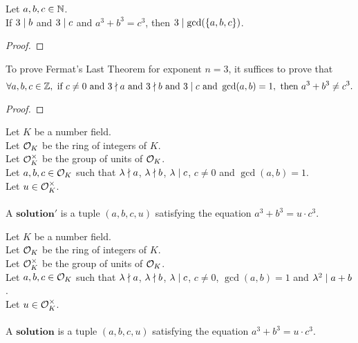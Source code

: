 \begin{lemma}
    \label{lmm:three_dvd_gcd_of_dvd_b_of_dvd_c}
    \leanok
    Let $a, b, c \in \mathbb{N}$. \\
    If $3 \mid b$ and $3 \mid c$ and $a ^ 3 + b ^ 3 = c ^ 3$, then $3 \mid \gcd(\left\{a, b, c\right\})$.
\end{lemma}
\begin{proof}
    \leanok
\end{proof}

\begin{theorem}
    \label{thm:fermatLastTheoremThree_of_three_dvd_only_c}
    \leanok
    To prove Fermat's Last Theorem for exponent $n=3$, it suffices to prove that
    $$\forall a, b, c \in \mathbb{Z}, \text{ if } c \neq 0 \text{ and } 3 \nmid a \text{ and }
    3 \nmid b \text{ and } 3 \mid c \text{ and } \gcd(a,b)=1,
    \text{ then } a^3 + b^3 \neq c^3.$$
\end{theorem}
\begin{proof}
    \leanok
\end{proof}

\begin{definition}[Solution$'$]
    \label{def:Solution'}
    \leanok
    Let $K$ be a number field. \\
    Let $\mathcal{O}_K$ be the ring of integers of $K$. \\
    Let $\mathcal{O}^\times_K$ be the group of units of $\mathcal{O}_K$. \\
    Let $a, b, c \in \mathcal{O}_K$ such that $\lambda \nmid a$,
    $\lambda \nmid b$, $\lambda \mid c$, $c \neq 0$ and $\gcd(a,b)=1$.\\
    Let $u \in \mathcal{O}^\times_K$. \\\\
    A $\boldsymbol{solution'}$ is a tuple $(a, b, c, u)$
    satisfying the equation $a^3 + b^3 = u \cdot c^3.$
\end{definition}

\begin{definition}[Solution]
    \label{def:Solution}
    \leanok
    Let $K$ be a number field. \\
    Let $\mathcal{O}_K$ be the ring of integers of $K$. \\
    Let $\mathcal{O}^\times_K$ be the group of units of $\mathcal{O}_K$. \\
    Let $a, b, c \in \mathcal{O}_K$ such that $\lambda \nmid a$,
    $\lambda \nmid b$, $\lambda \mid c$, $c \neq 0$, $\gcd(a,b)=1$
    and $\lambda^2 \mid a+b$. \\
    Let $u \in \mathcal{O}^\times_K$. \\\\
    A $\boldsymbol{solution}$ is a tuple $(a, b, c, u)$
    satisfying the equation $a^3 + b^3 = u \cdot c^3.$
\end{definition}

